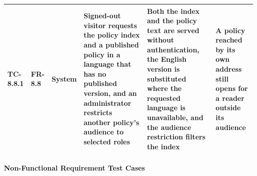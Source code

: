 \begin{longtable}{|>{\centering\arraybackslash}m{}|>{\centering\arraybackslash}m{}|>{\centering\arraybackslash}m{}|m{}|m{}|m{}|}
TC-8.8.1 & FR-8.8 & System & Signed-out visitor requests the policy index and a published policy in a language that has no published version, and an administrator restricts another policy's audience to selected roles & Both the index and the policy text are served without authentication, the English version is substituted where the requested language is unavailable, and the audience restriction filters the index & A policy reached by its own address still opens for a reader outside its audience \\ \hline

\end{longtable}

\paragraph{Non-Functional Requirement Test Cases}

